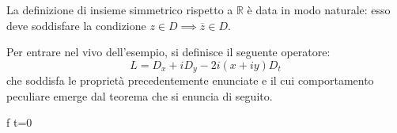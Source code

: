 \begin{example}
\begin{remark}
La definizione di insieme simmetrico rispetto a $\mathbb{R}$ è data in modo naturale: esso deve soddisfare la condizione $z \in D \implies \overline{z} \in D$.
\end{remark}

Per entrare nel vivo dell'esempio, si definisce il seguente operatore:
$$L=D_x+iD_y-2i(x+iy)D_t$$
che soddisfa le proprietà precedentemente enunciate e il cui comportamento peculiare emerge dal teorema che si enuncia di seguito.

\begin{theorem}\label{Lewy}
{f  t=0}
\end{theorem}


\end{example}
